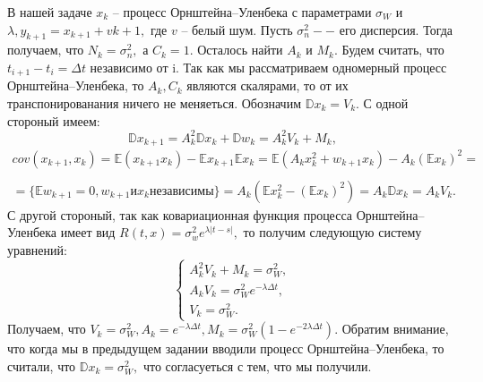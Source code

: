 \documentclass[11pt]{article}
\numberwithin{equation}{section}
\begin{document}
В нашей задаче $x_k$ -- процесс Орнштейна–Уленбека с параметрами 
$\sigma_W$ и $\lambda, y_{k+1}=x_{k+1} + v{k+1},$ где $v$ -- белый шум.
Пусть $\sigma_n^2 --$ его дисперсия. Тогда получаем, что $N_k = \sigma_n^2,$ а $C_k=1.$
Осталось найти $A_k$ и $M_k.$ Будем считать, что $t_{i+1}-t_i = \Delta t$ независимо от i.
Так как мы рассматриваем одномерный процесс Орнштейна–Уленбека, то $A_k, C_k$ являются скалярами,
то от их транспонированания ничего не меняеться. Обозначим $\mathbb{D}x_k=V_k.$
С одной стороный имеем:
$$  \mathbb{D}x_{k+1} = A_k^2\mathbb{D}x_k+\mathbb{D}w_k = A_k^2 V_k + M_k,$$
\begin{eqnarray}
  cov(x_{k+1},x_k) = \mathbb{E}(x_{k+1}x_k)- \mathbb{E}x_{k+1}\mathbb{E}x_k = \mathbb{E}(A_k x_k^2+w_{k+1}x_k)-A_k(\mathbb{E}x_k)^2 = \\
  \\ = \{ \mathbb{E} w_{k+1} = 0, w_{k+1} \text{и} x_k \text{независимы} \} = A_k(\mathbb{E}x_k^2-(\mathbb{E}x_k)^2) = A_k\mathbb{D}x_k = A_kV_k.
\end{eqnarray} 
С другой стороный, так как ковариационная функция процесса Орнштейна–Уленбека имеет вид 
$ R(t,x) = \sigma_w^2 e^{\lambda |t-s|},$ то получим следующую систему уравнений:
\begin{equation*}
  \begin{cases}
    A_k^2V_k + M_k = \sigma_W^2,\\
    A_kV_k = \sigma_W^2 e^{-\lambda \Delta t}, \\
    V_k = \sigma_W^2.
  \end{cases}
\end{equation*}
Получаем, что  $V_k = \sigma_W^2, A_k = e^{-\lambda\Delta t}, M_k = \sigma_W^2(1-e^{-2\lambda \Delta t}).$
Обратим внимание, что когда мы в предыдущем задании вводили процесс Орнштейна–Уленбека, то считали, что 
$\mathbb{D}x_k=  \sigma_W^2,$ что согласуеться с тем, что мы получили.
\end{document}
